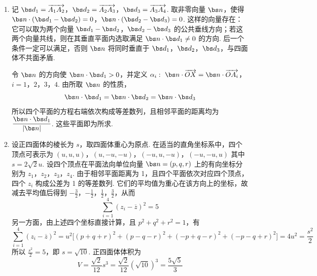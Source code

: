 \begin{solution}
\begin{enumerate}
\item 记
\(\bs d_1=\overrightarrow{A_1A_2}\)，\(\bs d_2=\overrightarrow{A_2A_3}\)，\(\bs d_3=\overrightarrow{A_3A_4}\). 取非零向量 \(\bs n\)，使得
\(\bs n\cdot(\bs d_1-\bs d_2)=0\)，\(\bs n\cdot(\bs d_2-\bs d_3)=0\).
这样的向量存在：它可以取为两个向量 \(\bs d_1-\bs d_2\)，\(\bs d_2-\bs d_3\) 的公共垂线方向；若这两个向量共线，则在其垂直平面内选取满足 \(\bs n\cdot\bs d_1\neq0\) 的方向. 后一个条件一定可以满足，否则 \(\bs n\) 将同时垂直于 \(\bs d_1\)，\(\bs d_2\)，\(\bs d_3\)，与四面体不共面矛盾.

令 \(\bs n\) 的方向使 \(\bs n\cdot\bs d_1>0\)，并定义
\(\alpha_i:\ \bs n\cdot\overrightarrow{OX}=\bs n\cdot\overrightarrow{OA_i}\)，\(i=1\)，\(2\)，\(3\)，\(4\).
由所取 \(\bs n\) 的性质，
\[
\bs n\cdot\bs d_1=\bs n\cdot\bs d_2=\bs n\cdot\bs d_3
\]
所以四个平面的方程右端依次构成等差数列，且相邻平面的距离均为
\(\dfrac{\bs n\cdot\bs d_1}{|\bs n|}\). 这些平面即为所求.

\item 设正四面体的棱长为 \(s\)，取四面体重心为原点. 在适当的直角坐标系中，四个顶点可表示为
\((u,u,u)\)，\((u,-u,-u)\)，\((-u,u,-u)\)，\((-u,-u,u)\)
其中 \(s=2\sqrt2u\). 设四个顶点在平面法向单位向量
\(\bs n=(p,q,r)\) 上的有向坐标分别为 \(z_1\)，\(z_2\)，\(z_3\)，\(z_4\). 由于相邻平面距离为 1，且四个平面依次对应四个顶点，四个 \(z_i\) 构成公差为 1 的等差数列. 它们的平均值为重心在该方向上的坐标，故减去平均值后得到
\(-\frac{3}{2}\)，\(-\frac{1}{2}\)，\(\frac{1}{2}\)，\(\frac{3}{2}\)，从而
\[
\sum_{i=1}^{4}(z_i-\overline z)^2=5
\]
另一方面，由上述四个坐标直接计算，且 \(p^2+q^2+r^2=1\)，有
\[
\sum_{i=1}^{4}(z_i-\overline z)^2
=u^2\bigl[(p+q+r)^2+(p-q-r)^2+(-p+q-r)^2+(-p-q+r)^2\bigr]
=4u^2=\frac{s^2}{2}
\]
所以 \(\frac{s^2}{2}=5\)，即 \(s=\sqrt{10}\). 正四面体体积为
\[
V=\frac{\sqrt2}{12}s^3=\frac{\sqrt2}{12}(\sqrt{10})^3=\frac{5\sqrt5}{3}
\]
\end{enumerate}
\end{solution}
